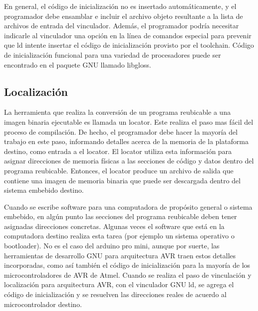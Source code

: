 \documentclass[12pt]{article}
\begin{document}
En general, el código de inicialización no es insertado automáticamente, y el
programador debe ensamblar e incluir el archivo objeto resultante a la 
lista de archivos de entrada del vinculador. Además, el programador
podría necesitar indicarle al vinculador una opción en la línea de comandos especial
para prevenir que ld intente insertar el código de inicialización provisto
por el toolchain.
Código de inicialización funcional para una variedad de procesadores puede
ser encontrado en el paquete GNU llamado libgloss.



\subsection *{Localización}

La herramienta que realiza la conversión de un programa reubicable a
una imagen binaria ejecutable es llamada un locator.
Este realiza el paso mas fácil del proceso de compilación. De hecho, 
el programador debe hacer la mayoría del trabajo en este paso, informando
detalles acerca de la memoria de la plataforma destino, como entrada
a el locator. El locator utiliza esta información para asignar direcciones
de memoria físicas a las secciones de código y datos dentro del programa
reubicable. Entonces, el locator produce un archivo de salida que contiene
una imagen de memoria binaria que puede ser descargada dentro del sistema
embebido destino.

Cuando se escribe software para una computadora de propósito general o
sistema embebido, en algún punto las secciones del programa reubicable
deben tener asignadas direcciones concretas. Algunas veces el software
que está en la computadora destino realiza esta tarea (por ejemplo un sistema
operativo o bootloader). No es el caso del arduino pro mini, aunque por suerte,
las herramientas de desarrollo GNU para arquitectura AVR traen estos detalles 
incorporadas, como así también el código de inicialización para la mayoría
de los microcontroladores de AVR de Atmel.
Cuando se realiza el paso de vinculación y localización para arquitectura AVR,
con el vinculador GNU ld, se agrega el código de inicialización y se 
resuelven las direcciones reales de acuerdo al microcontrolador destino.
\end{document}
